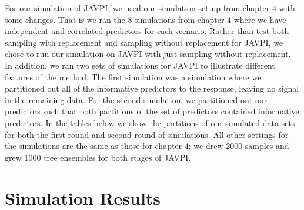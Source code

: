 \documentclass[12pt,twoside]{reedthesis}
\theoremstyle{definition}
\theoremstyle{definition}
\theoremstyle{definition}
\theoremstyle{remark}
\begin{document}
For our simulation of JAVPI, we used our simulation set-up from chapter
4 with some changes. That is we ran the 8 simulations from chapter 4
where we have independent and correlated predictors for each scenario.
Rather than test both sampling with replacement and sampling without
replacement for JAVPI, we chose to run our simulation on JAVPI with just
sampling without replacement. In addition, we ran two sets of
simulations for JAVPI to illustrate different features of the method.
The first simulation was a simulation where we partitioned out all of
the informative predictors to the response, leaving no signal in the
remaining data. For the second simulation, we partitioned out our
predictors such that both partitions of the set of predictors contained
informative predictors. In the tables below we show the partitions of
our simulated data sets for both the first round and second round of
simulations. All other settings for the simulations are the same as
those for chapter 4: we drew 2000 samples and grew 1000 tree ensembles
for both stages of JAVPI. \par 
\begin{table}

\caption{\label{tab:unnamed-chunk-26}Partitions for Simulation Runs 1 and 2, respectively}
\centering
{}
\end{table}
\section{Simulation Results}\label{simulation-results-1}
\end{document}
